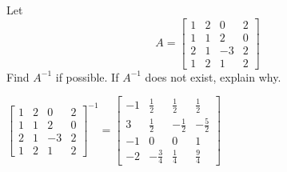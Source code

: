 \documentclass{ximera}
\begin{document}
\begin{problem}\label{prb:4.43}Let
\begin{equation*}
A=\left[
\begin{array}{rrrr}
1 & 2 & 0 & 2 \\
1 & 1 & 2 & 0 \\
2 & 1 & -3 & 2 \\
1 & 2 & 1 & 2
\end{array}
\right]
\end{equation*}
Find $A^{-1}$ if possible. If $A^{-1}$ does not exist, explain why.
\begin{hint}
$\left[
\begin{array}{rrrr}
1 & 2 & 0 & 2 \\
1 & 1 & 2 & 0 \\
2 & 1 & -3 & 2 \\
1 & 2 & 1 & 2
\end{array}
\right]^{-1}= \left[
\begin{array}{rrrr}
-1 &  \frac{1}{2} &   \frac{1}{2} &   \frac{1}{2} \\
3 &   \frac{1}{2} & -  \frac{1}{2} & -  \frac{5}{2} \\
-1 & 0 & 0 & 1 \\
-2 & -  \frac{3}{4} &   \frac{1}{4} &   \frac{9}{4}
\end{array}
\right]$
\end{hint}
\end{problem}
\end{document}
